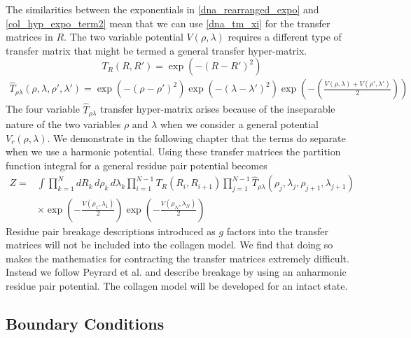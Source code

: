%
The similarities between the exponentials in \eqref{dna_rearranged_expo} and \eqref{col_hyp_expo_term2} mean that we can use \eqref{dna_tm_xi} for the transfer matrices in $R$. The two variable potential $V\left(\rho,\lambda\right)$ requires a different type of transfer matrix that might be termed a general transfer hyper-matrix. 
%
\begin{equation}\label{col_hyp_trans_R}
T_{R}\left(R,R'\right) = \exp\left(-\left(R-R'\right)^2\right)
\end{equation}
%
\begin{equation}\label{col_hyp_trans_rho_lambda}
\begin{split}
\hat{T}_{\rho\lambda}\left(\rho,\lambda,\rho',\lambda'\right) = \exp\left(-\left(\rho-\rho'\right)^2\right)\exp\left(-\left(\lambda-\lambda'\right)^2\right)\exp\left(-\left(\frac{V\left(\rho,\lambda\right)+V\left(\rho',\lambda'\right)}{2}\right)\right)
\end{split}
\end{equation}
%
The four variable $\hat{T}_{\rho\lambda}$ transfer hyper-matrix arises because of the inseparable nature of the two variables $\rho$ and $\lambda$ when we consider a general potential $V_{r}\left(\rho,\lambda\right)$. We demonstrate in the following chapter that the terms do separate when we use a harmonic potential. Using these transfer matrices the partition function integral for a general residue pair potential becomes
%
\begin{align}\label{col_hyp_part_int}
Z=&\int\prod^{N}_{k=1}dR_k\,d\rho_k\,d\lambda_k\prod^{N-1}_{i=1}T_{R}(R_i,R_{i+1})\prod^{N-1}_{j=1}\hat{T}_{\rho\lambda}(\rho_j,\lambda_j,\rho_{j+1},\lambda_{j+1})\nonumber \\
&\times\exp\left(-\frac{V\left(\rho_{1},\lambda_{1}\right)}{2}\right)\exp\left(-\frac{V\left(\rho_{N},\lambda_{N}\right)}{2}\right)
\end{align}
%
Residue pair breakage descriptions introduced as $g$ factors into the transfer matrices will not be included into the collagen model. We find that  doing so makes the mathematics for contracting the transfer matrices extremely difficult. Instead we follow Peyrard et al. and describe breakage by using an anharmonic residue pair potential. The collagen model will be developed for an intact state.

\subsection{Boundary Conditions}

